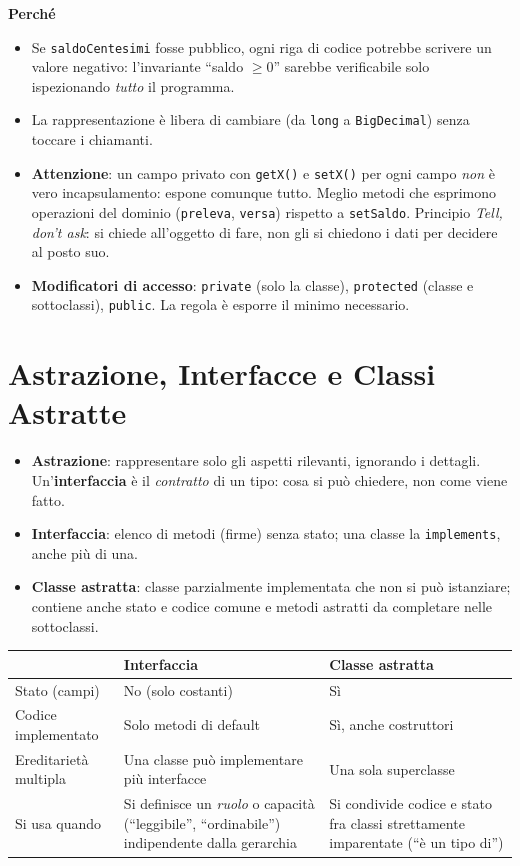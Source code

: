 \textbf{Perché}
\begin{itemize}
    \item Se \texttt{saldoCentesimi} fosse pubblico, ogni riga di codice potrebbe scrivere un valore negativo: l'invariante ``saldo $\geq 0$'' sarebbe verificabile solo ispezionando \emph{tutto} il programma.
    \item La rappresentazione è libera di cambiare (da \texttt{long} a \texttt{BigDecimal}) senza toccare i chiamanti.
    \item \textbf{Attenzione}: un campo privato con \texttt{getX()} e \texttt{setX()} per ogni campo \emph{non} è vero incapsulamento: espone comunque tutto. Meglio metodi che esprimono operazioni del dominio (\texttt{preleva}, \texttt{versa}) rispetto a \texttt{setSaldo}. Principio \emph{Tell, don't ask}: si chiede all'oggetto di fare, non gli si chiedono i dati per decidere al posto suo.
    \item \textbf{Modificatori di accesso}: \texttt{private} (solo la classe), \texttt{protected} (classe e sottoclassi), \texttt{public}. La regola è esporre il minimo necessario.
\end{itemize}

\section{Astrazione, Interfacce e Classi Astratte}
\begin{itemize}
    \item \textbf{Astrazione}: rappresentare solo gli aspetti rilevanti, ignorando i dettagli. Un'\textbf{interfaccia} è il \emph{contratto} di un tipo: cosa si può chiedere, non come viene fatto.
    \item \textbf{Interfaccia}: elenco di metodi (firme) senza stato; una classe la \texttt{implements}, anche più di una.
    \item \textbf{Classe astratta}: classe parzialmente implementata che non si può istanziare; contiene anche stato e codice comune e metodi astratti da completare nelle sottoclassi.
\end{itemize}

\begin{center}
\small
\begin{tabularx}{\textwidth}{@{}>{\raggedright\arraybackslash}p{3cm}XX@{}}
\toprule
 & \textbf{Interfaccia} & \textbf{Classe astratta} \\
\midrule
Stato (campi) & No (solo costanti) & Sì \\
Codice implementato & Solo metodi di default & Sì, anche costruttori \\
Ereditarietà multipla & Una classe può implementare più interfacce & Una sola superclasse \\
Si usa quando & Si definisce un \emph{ruolo} o capacità (``leggibile'', ``ordinabile'') indipendente dalla gerarchia & Si condivide codice e stato fra classi strettamente imparentate (``è un tipo di'') \\
\bottomrule
\end{tabularx}
\end{center}

